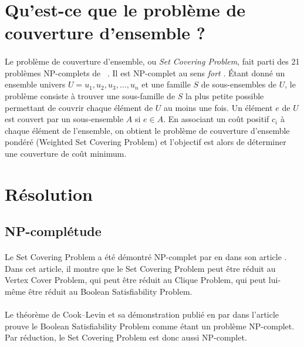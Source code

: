 \documentclass[12pt,letterpaper,twoside]{article}
\begin{document}
	\maketitle{}
	\section{Qu'est-ce que le problème de couverture d'ensemble ?}
		\paragraph*{}
			Le problème de couverture d'ensemble, ou \emph{Set Covering Problem},
			fait parti des 21 problèmes NP-complets de \citeauthor{Karp1972}~\cite{Karp1972}.
			Il est NP-complet au sens \emph{fort} \cite{garey2002computers, caprara2000algorithms}.
			Étant donné un ensemble univers \(U = {u_1, u_2, u_3, \dots, u_n}\) et une famille \(S\) de sous-ensembles de \(U\),
			le problème consiste à trouver une sous-famille de \(S\) la plus petite possible permettant de couvrir chaque élément de \(U\)
			au moins une fois. Un élément \(e\) de \(U\) est couvert par un sous-ensemble \(A\) si \(e \in A\). En associant un coût positif \(c_i\)
			à chaque élément de l'ensemble, on obtient le problème de couverture d'ensemble pondéré (Weighted Set Covering Problem) et
			l'objectif est alors de déterminer une couverture de coût minimum.~\cite{Vazirani2003}
	\section{Résolution}
		\subsection{NP-complétude}
			\paragraph*{}
				Le Set Covering Problem a été démontré NP-complet par \citeauthor{Karp1972} en \citeyear{Karp1972} dans son article \cite{Karp1972}. Dans cet article, il montre que le Set Covering Problem peut être réduit au Vertex Cover Problem, qui peut être réduit au Clique Problem, qui peut lui-même être réduit au Boolean Satisfiability Problem.
			\paragraph*{}
				Le théorème de Cook–Levin et sa démonstration publié en \citeyear{Cook1971} par \citeauthor{Cook1971} dans l'article \cite{Cook1971} prouve le Boolean Satisfiability Problem comme étant un problème NP-complet. Par réduction, le Set Covering Problem est donc aussi NP-complet.
	\newpage\printbibliography[heading=bibintoc]{}
\end{document}
